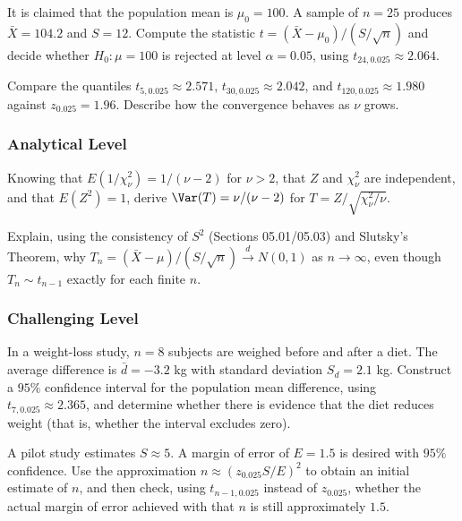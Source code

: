 \begin{problema}
	\label{prob:5.4.5}
	It is claimed that the population mean is $\mu_0=100$. A sample of $n=25$ produces $\bar X=104.2$ and $S=12$. Compute the statistic $t=(\bar X-\mu_0)/(S/\sqrt n)$ and decide whether $H_0:\mu=100$ is rejected at level $\alpha=0.05$, using $t_{24,0.025}\approx 2.064$.
\end{problema}

\begin{problema}
	\label{prob:5.4.6}
	Compare the quantiles $t_{5,0.025}\approx 2.571$, $t_{30,0.025}\approx 2.042$, and $t_{120,0.025}\approx 1.980$ against $z_{0.025}=1.96$. Describe how the convergence behaves as $\nu$ grows.
\end{problema}

\subsubsection*{Analytical Level}

\begin{problema}
	\label{prob:5.4.7}
	Knowing that $E(1/\chi^2_\nu) = 1/(\nu-2)$ for $\nu>2$, that $Z$ and $\chi^2_\nu$ are independent, and that $E(Z^2)=1$, derive $\Var(T)=\nu/(\nu-2)$ for $T=Z/\sqrt{\chi^2_\nu/\nu}$.
\end{problema}

\begin{problema}
	\label{prob:5.4.8}
	Explain, using the consistency of $S^2$ (Sections 05.01/05.03) and Slutsky's Theorem, why $T_n=(\bar X-\mu)/(S/\sqrt n) \xrightarrow{d} N(0,1)$ as $n\to\infty$, even though $T_n \sim t_{n-1}$ exactly for each finite $n$.
\end{problema}

\subsubsection*{Challenging Level}

\begin{problema}
	\label{prob:5.4.9}
	In a weight-loss study, $n=8$ subjects are weighed before and after a diet. The average difference is $\bar d=-3.2$ kg with standard deviation $S_d=2.1$ kg. Construct a $95\%$ confidence interval for the population mean difference, using $t_{7,0.025}\approx 2.365$, and determine whether there is evidence that the diet reduces weight (that is, whether the interval excludes zero).
\end{problema}

\begin{problema}
	\label{prob:5.4.10}
	A pilot study estimates $S\approx 5$. A margin of error of $E=1.5$ is desired with $95\%$ confidence. Use the approximation $n\approx(z_{0.025}S/E)^2$ to obtain an initial estimate of $n$, and then check, using $t_{n-1,0.025}$ instead of $z_{0.025}$, whether the actual margin of error achieved with that $n$ is still approximately $1.5$.
\end{problema}

